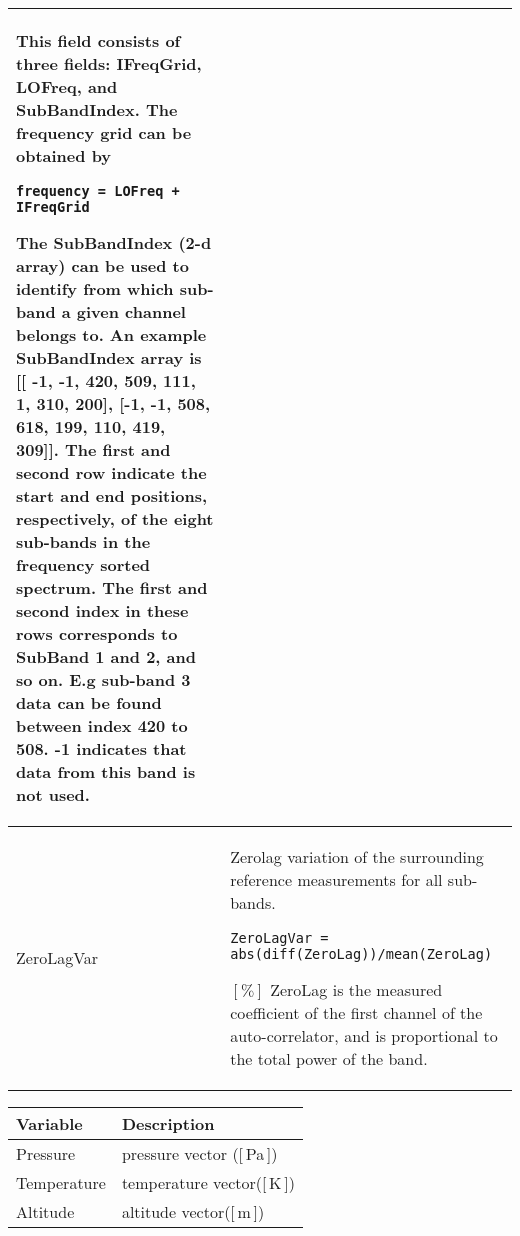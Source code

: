 \begin{longtable}{| p{} | p{} |}
                       This field consists of three fields: IFreqGrid, LOFreq, and SubBandIndex.
                       The frequency grid can be obtained by
                       \begin{verbatim}frequency = LOFreq + IFreqGrid\end{verbatim}
                       The SubBandIndex (2-d array) can be used to identify from which sub-band a given
                       channel belongs to. 
                       An example SubBandIndex array is [[ -1, -1, 420, 509, 111, 1, 310, 200], 
                       [-1, -1, 508, 618, 199, 110, 419, 309]].
                       The first and second row indicate the start and end positions, respectively,
                       of the eight sub-bands in the frequency sorted spectrum. 
                       The first and second index in these rows corresponds to SubBand 1 and 2, and so
                       on. E.g sub-band 3 data can be found between index 420 to 508.
                       -1 indicates that data from this band is not used.\\ \hline 
     ZeroLagVar      & Zerolag variation of the surrounding reference measurements for all sub-bands.
                       \begin{verbatim}ZeroLagVar = abs(diff(ZeroLag))/mean(ZeroLag)\end{verbatim} \([\%]\)
                        ZeroLag is the measured coefficient of the first channel of the auto-correlator,
                        and is proportional to the total power of the band. \\ \hline
\hline
\end{longtable}

\clearpage
\newpage

\begin{table}
\caption{ \smr\ PTZ data format. 
Example URL: \url{http://malachite.rss.chalmers.se/rest_api/v4/ptz/2015-01-03/AC1/2/7002887494}}
\label{table:ptzdataformat}
\begin{longtable}{| p{} | p{} |}
\hline
  \textbf{Variable} & \textbf{Description} \\
  \hline
    Pressure        & pressure vector ([\,Pa\,])  \\ \hline
    Temperature     & temperature vector([\,K\,]) \\ \hline
    Altitude        & altitude vector([\,m\,]) \\ \hline
\hline
\end{longtable}
\end{table}
\addtocounter{table}{-1}


